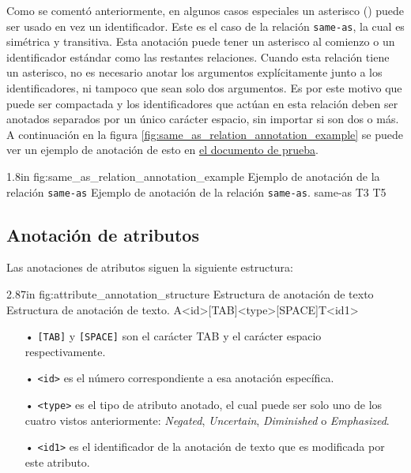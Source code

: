 Como se comentó anteriormente, en algunos casos especiales un asterisco (\doublequote{\,*\,}) puede ser usado en vez un identificador. Este es el caso de la relación \texttt{same-as}, la cual es simétrica y transitiva. Esta anotación puede tener un asterisco al comienzo o un identificador estándar como las restantes relaciones. Cuando esta relación tiene un asterisco, no es necesario anotar los argumentos explícitamente junto a los identificadores, ni tampoco que sean solo dos argumentos. Es por este motivo que puede ser compactada y los identificadores que actúan en esta relación deben ser anotados separados por un único carácter espacio, sin importar si son dos o más. A continuación en la figura \ref{fig:same_as_relation_annotation_example} se puede ver un ejemplo de anotación de esto en \hyperref[sentence:annotation_example]{el documento de prueba}.

\begin{annexample}
	[backgroundcolor=cyan!13]
	{1.8in}
	{fig:same_as_relation_annotation_example}
	{Ejemplo de anotación de la relación \texttt{same-as}}
	{Ejemplo de anotación de la relación \texttt{same-as}.}
	\textasteriskcentered\space\space\space same-as T3 T5
\end{annexample}

\subsection{Anotación de atributos}
Las anotaciones de atributos siguen la siguiente estructura:

\begin{annexample}
	[backgroundcolor=green!13]
	{2.87in}
	{fig:attribute_annotation_structure}
	{Estructura de anotación de texto}
	{Estructura de anotación de texto.}
	A<id>[TAB]<type>[SPACE]T<id1>
\end{annexample}

\begin{itemize}
	\item[•] \texttt{[TAB]} y \texttt{[SPACE]} son el carácter TAB y el carácter espacio respectivamente.
	\vspace{-0.1in}
	\item[•] \texttt{<id>} es el número correspondiente a esa anotación específica.
	\vspace{-0.1in}
	\item[•] \texttt{<type>} es el tipo de atributo anotado, el cual puede ser solo uno de los cuatro vistos anteriormente: {\it Negated}, {\it Uncertain}, {\it Diminished} o {\it Emphasized}.
	\vspace{-0.1in}
	\item[•] \texttt{<id1>} es el identificador de la anotación de texto que es modificada por este atributo.
\end{itemize}

